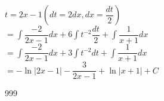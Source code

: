 \documentclass[a4paper]{article}
\begin{document}
$ t = 2x-1 \left(dt = 2dx, dx = \dfrac{dt}{2} \right)$\\

$ =\displaystyle\int \dfrac{-2}{2x-1}dx+6\displaystyle\int t^{-2}\dfrac{dt}{2}+\displaystyle\int \dfrac{1}{x+1}dx $\\

$ =\displaystyle\int \dfrac{-2}{2x-1}dx+3\displaystyle\int t^{-2}dt+\displaystyle\int \dfrac{1}{x+1}dx $\\

$ =-\ln|2x-1|-\dfrac{3}{2x-1}+\ln|x+1|+C $\\

\begin{thebibliography}{999}
\end{thebibliography}
\end{document}
